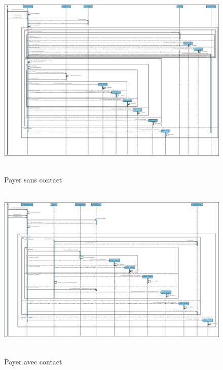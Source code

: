 \documentclass[]{report}
\begin{document}
\begin{figure}[h!]
\hbox{
    \centering\includegraphics[width=\linewidth]{img/Sequence 4 - Extension 6.pdf}
}
\caption{Payer sans contact}
\end{figure}



\newpage

\begin{figure}[h!]
\hbox{
    \centering\includegraphics[width=\linewidth]{img/Sequence 5 - Extension 6.pdf}
}
\caption{Payer avec contact}
\end{figure}



\newpage
\end{document}
